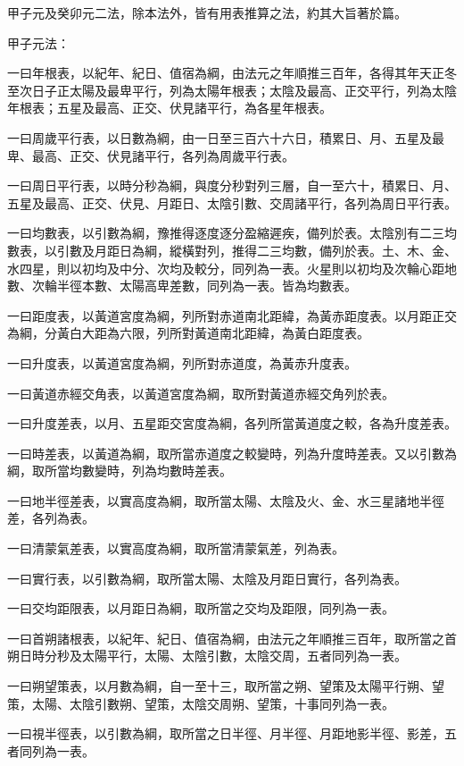 \begin{pinyinscope}
甲子元及癸卯元二法，除本法外，皆有用表推算之法，約其大旨著於篇。

甲子元法：

一曰年根表，以紀年、紀日、值宿為綱，由法元之年順推三百年，各得其年天正冬至次日子正太陽及最卑平行，列為太陽年根表；太陰及最高、正交平行，列為太陰年根表；五星及最高、正交、伏見諸平行，為各星年根表。

一曰周歲平行表，以日數為綱，由一日至三百六十六日，積累日、月、五星及最卑、最高、正交、伏見諸平行，各列為周歲平行表。

一曰周日平行表，以時分秒為綱，與度分秒對列三層，自一至六十，積累日、月、五星及最高、正交、伏見、月距日、太陰引數、交周諸平行，各列為周日平行表。

一曰均數表，以引數為綱，豫推得逐度逐分盈縮遲疾，備列於表。太陰別有二三均數表，以引數及月距日為綱，縱橫對列，推得二三均數，備列於表。土、木、金、水四星，則以初均及中分、次均及較分，同列為一表。火星則以初均及次輪心距地數、次輪半徑本數、太陽高卑差數，同列為一表。皆為均數表。

一曰距度表，以黃道宮度為綱，列所對赤道南北距緯，為黃赤距度表。以月距正交為綱，分黃白大距為六限，列所對黃道南北距緯，為黃白距度表。

一曰升度表，以黃道宮度為綱，列所對赤道度，為黃赤升度表。

一曰黃道赤經交角表，以黃道宮度為綱，取所對黃道赤經交角列於表。

一曰升度差表，以月、五星距交宮度為綱，各列所當黃道度之較，各為升度差表。

一曰時差表，以黃道為綱，取所當赤道度之較變時，列為升度時差表。又以引數為綱，取所當均數變時，列為均數時差表。

一曰地半徑差表，以實高度為綱，取所當太陽、太陰及火、金、水三星諸地半徑差，各列為表。

一曰清蒙氣差表，以實高度為綱，取所當清蒙氣差，列為表。

一曰實行表，以引數為綱，取所當太陽、太陰及月距日實行，各列為表。

一曰交均距限表，以月距日為綱，取所當之交均及距限，同列為一表。

一曰首朔諸根表，以紀年、紀日、值宿為綱，由法元之年順推三百年，取所當之首朔日時分秒及太陽平行，太陽、太陰引數，太陰交周，五者同列為一表。

一曰朔望策表，以月數為綱，自一至十三，取所當之朔、望策及太陽平行朔、望策，太陽、太陰引數朔、望策，太陰交周朔、望策，十事同列為一表。

一曰視半徑表，以引數為綱，取所當之日半徑、月半徑、月距地影半徑、影差，五者同列為一表。


\end{pinyinscope}

